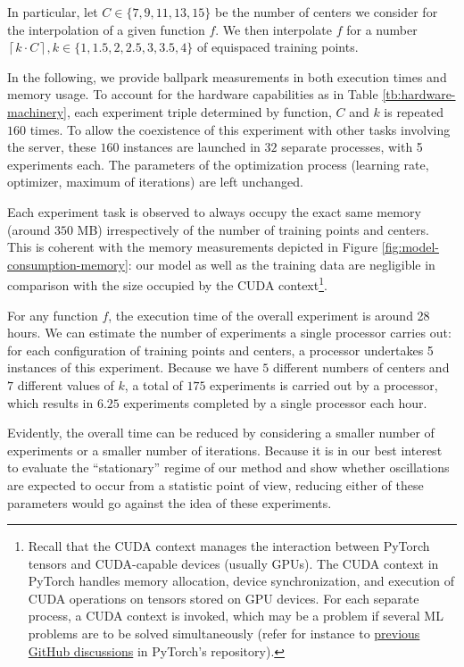 \documentclass[12pt]{report} %
\begin{document}
In particular, let $C \in \{7,9,11,13,15\}$ be the number of centers we consider for
the interpolation of a given function $f$. We then interpolate $f$ for a number
$\left\lceil k \cdot C \right\rceil, k \in \{1,1.5,2,2.5,3,3.5,4\} $ of equispaced
training points. 

In the following, we provide ballpark measurements in both execution times and memory usage. To account for the hardware capabilities as in Table
\ref{tb:hardware-machinery}, each experiment triple determined by function, $C$ and $k$ is
repeated $160$ times. To allow the coexistence of this experiment with other tasks involving the server, these $160$ instances are launched in $32$ separate
processes, with 5 experiments each. The parameters of the optimization process (learning rate, optimizer, maximum of iterations) are left unchanged.

Each experiment task is observed to always occupy the exact same memory (around $350$ MB) irrespectively of the number of training points and centers. This is coherent with the memory measurements depicted in Figure \ref{fig:model-consumption-memory}: our model as well as the training data are negligible in comparison with the size occupied by the CUDA context\footnote{Recall that the CUDA context manages the interaction between PyTorch tensors and CUDA-capable devices (usually GPUs). The CUDA context in PyTorch handles memory allocation, device synchronization, and execution of CUDA operations on tensors stored on GPU devices. For each separate process, a CUDA context is invoked, which may be a problem if several ML problems are to be solved simultaneously (refer for instance to \href{https://github.com/pytorch/pytorch/issues/20532}{previous GitHub discussions} in PyTorch's repository).}.

For any function $f$, the execution time of the overall experiment is around 28 hours. We can estimate the number of experiments a single processor carries out: for each configuration of training points and centers, a processor undertakes 5 instances of this experiment. Because we have $5$ different numbers of centers and $7$ different values of $k$, a total of $175$ experiments is carried out by a processor, which results in $6.25$ experiments completed by a single processor each hour. 

Evidently, the overall time can be reduced by considering a smaller number of experiments or a smaller number of iterations. Because it is in our best interest to evaluate the ``stationary'' regime of our method and show whether oscillations are expected to occur from a statistic point of view, reducing either of these parameters would go against the idea of these experiments.
\end{document}

